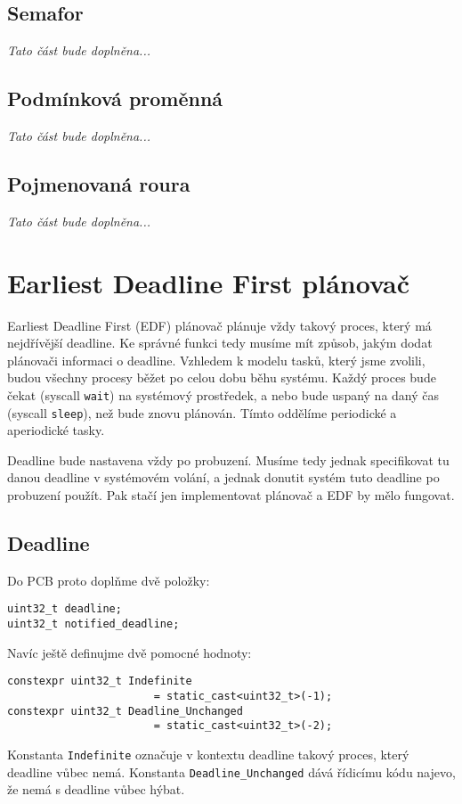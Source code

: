 \documentclass{article}
\begin{document}
\subsection{Semafor}

\emph{Tato část bude doplněna...}

\subsection{Podmínková proměnná}

\emph{Tato část bude doplněna...}

\subsection{Pojmenovaná roura}

\emph{Tato část bude doplněna...}

\section{Earliest Deadline First plánovač}

Earliest Deadline First (EDF) plánovač plánuje vždy takový proces, který má nejdřívější deadline. Ke správné funkci tedy musíme mít způsob, jakým dodat plánovači informaci o deadline. Vzhledem k modelu tasků, který jsme zvolili, budou všechny procesy běžet po celou dobu běhu systému. Každý proces bude čekat (syscall \texttt{wait}) na systémový prostředek, a nebo bude uspaný na daný čas (syscall \texttt{sleep}), než bude znovu plánován. Tímto oddělíme periodické a aperiodické tasky.

Deadline bude nastavena vždy po probuzení. Musíme tedy jednak specifikovat tu danou deadline v systémovém volání, a jednak donutit systém tuto deadline po probuzení použít. Pak stačí jen implementovat plánovač a EDF by mělo fungovat.

\subsection{Deadline}

Do PCB proto doplňme dvě položky:
\begin{lstlisting}
uint32_t deadline;
uint32_t notified_deadline;
\end{lstlisting}
Navíc ještě definujme dvě pomocné hodnoty:
\begin{lstlisting}
constexpr uint32_t Indefinite
                       = static_cast<uint32_t>(-1);
constexpr uint32_t Deadline_Unchanged
                       = static_cast<uint32_t>(-2);
\end{lstlisting}
Konstanta \texttt{Indefinite} označuje v kontextu deadline takový proces, který deadline vůbec nemá. Konstanta \texttt{Deadline\_Unchanged} dává řídicímu kódu najevo, že nemá s deadline vůbec hýbat.
\end{document}
